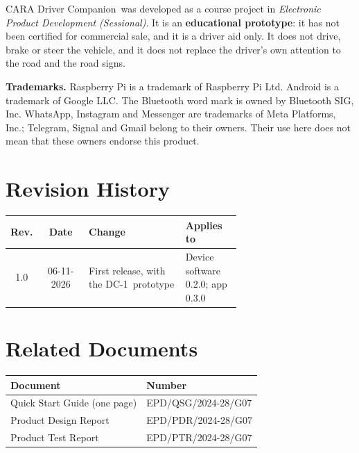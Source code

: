 \documentclass[11pt,a4paper,oneside]{report}
\newcommand{\hdr}[1]{\cellcolor{LightBlue}\textbf{#1}}
\newcommand{\ProductName}{CARA Driver Companion}
\newcommand{\ModelNo}{DC-1}
\newcommand{\IssueDate}{06-11-2026}
\newcommand{\FWVer}{0.2.0}
\newcommand{\AppVer}{0.3.0}
\begin{document}
\ProductName\ was developed as a course project in \emph{Electronic Product Development (Sessional)}. It is an \textbf{educational prototype}: it has not been certified for commercial sale, and it is a driver aid only. It does not drive, brake or steer the vehicle, and it does not replace the driver's own attention to the road and the road signs.

\textbf{Trademarks.} Raspberry Pi is a trademark of Raspberry Pi Ltd. Android is a trademark of Google LLC. The Bluetooth word mark is owned by Bluetooth SIG, Inc. WhatsApp, Instagram and Messenger are trademarks of Meta Platforms, Inc.; Telegram, Signal and Gmail belong to their owners. Their use here does not mean that these owners endorse this product.

\section*{Revision History}
\begin{table}[H]\centering\small
\begin{tabular}{|c|c|p{0.42\linewidth}|>{\raggedright\arraybackslash}p{0.24\linewidth}|}\hline
\hdr{Rev.} & \hdr{Date} & \hdr{Change} & \hdr{Applies to}\\ \hline
1.0 & \IssueDate & First release, with the \ModelNo\ prototype & Device software \FWVer; app \AppVer\\ \hline
\end{tabular}\end{table}

\section*{Related Documents}
\begin{table}[H]\centering\small
\begin{tabular}{|l|l|}\hline
\hdr{Document} & \hdr{Number}\\ \hline
Quick Start Guide (one page) & EPD/QSG/2024-28/G07\\ \hline
Product Design Report & EPD/PDR/2024-28/G07\\ \hline
Product Test Report & EPD/PTR/2024-28/G07\\ \hline
\end{tabular}\end{table}
\end{document}
